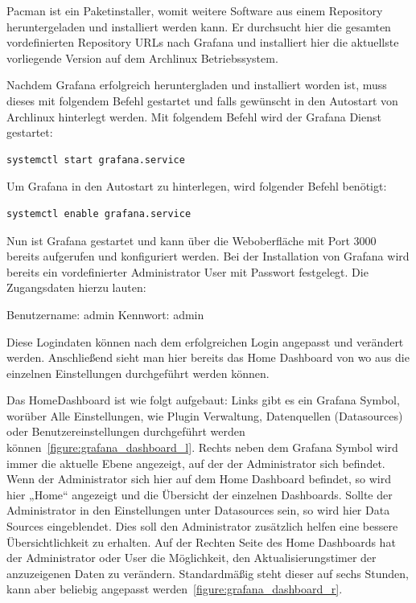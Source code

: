 Pacman ist ein Paketinstaller, womit weitere Software aus einem Repository
heruntergeladen und installiert werden kann. Er durchsucht hier die gesamten
vordefinierten Repository URLs nach Grafana und installiert hier die aktuellste
vorliegende Version auf dem Archlinux Betriebssystem.

Nachdem Grafana erfolgreich heruntergladen und installiert worden ist, muss
dieses mit folgendem Befehl gestartet und falls gewünscht in den Autostart von
Archlinux hinterlegt werden. Mit folgendem Befehl wird der Grafana Dienst
gestartet:
\begin{lstlisting}[language=bash]
systemctl start grafana.service
\end{lstlisting}

Um Grafana in den Autostart zu hinterlegen, wird folgender Befehl benötigt:
\begin{lstlisting}[language=bash]
systemctl enable grafana.service
\end{lstlisting}

Nun ist Grafana gestartet und kann über die Weboberfläche mit Port 3000
bereits aufgerufen und konfiguriert werden. Bei der Installation von Grafana
wird bereits ein vordefinierter Administrator User mit Passwort festgelegt. Die
Zugangsdaten hierzu lauten:

\begin{outline}
  \1 Benutzername: admin
  \1 Kennwort: admin
\end{outline}

Diese Logindaten können nach dem erfolgreichen Login angepasst und verändert
werden. Anschließend sieht man hier bereits das Home Dashboard von wo aus die
einzelnen Einstellungen durchgeführt werden können.

Das HomeDashboard ist wie folgt aufgebaut: Links gibt es ein Grafana Symbol,
worüber Alle Einstellungen, wie Plugin Verwaltung, Datenquellen (Datasources)
oder Benutzereinstellungen durchgeführt werden
können~\ref{figure:grafana_dashboard_l}. Rechts neben dem Grafana Symbol wird
immer die aktuelle Ebene angezeigt, auf der der Administrator sich befindet.
Wenn der Administrator sich hier auf dem Home Dashboard befindet, so wird hier
„Home“ angezeigt und die Übersicht der einzelnen Dashboards. Sollte der
Administrator in den Einstellungen unter Datasources sein, so wird hier Data
Sources eingeblendet. Dies soll den Administrator zusätzlich helfen eine
bessere Übersichtlichkeit zu erhalten. Auf der Rechten Seite des Home
Dashboards hat der Administrator oder User die Möglichkeit, den
Aktualisierungstimer der anzuzeigenen Daten zu verändern. Standardmäßig steht
dieser auf sechs Stunden, kann aber beliebig angepasst
werden~\ref{figure:grafana_dashboard_r}.


